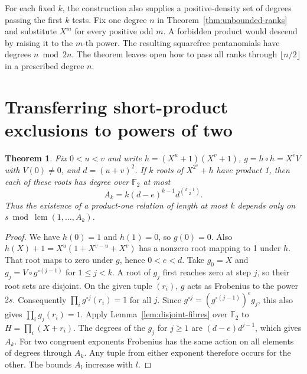\documentclass[11pt]{article}
\newtheorem{theorem}{Theorem}
\newcommand{\F}{\mathbb F_2}
\begin{document}
For each fixed \(k\), the construction also supplies a positive-density
set of degrees passing the first \(k\) tests. Fix one degree \(n\) in
Theorem~\ref{thm:unbounded-ranks} and substitute \(X^m\) for every
positive odd \(m\). A forbidden product would descend by raising it to
the \(m\)-th power. The resulting squarefree pentanomials have degrees
\(n\bmod 2n\). The theorem leaves open how to pass all ranks through
\(\lfloor n/2\rfloor\) in a prescribed degree \(n\).

\section{Transferring short-product exclusions to powers of two}

\begin{theorem}\label{thm:all-rank-period}
Fix \(0<u<v\) and write \(h=(X^u+1)(X^v+1)\),
\(g=h\circ h=X^e V\) with \(V(0)\ne0\), and \(d=(u+v)^2\).
If \(k\) roots of \(X^{2^s}+h\) have product 1, then each of these
roots has degree over \(\F\) at most
\[
                A_k=k(d-e)^{k-1}d^{\binom{k-1}{2}}.
\]
Thus the existence of a product-one relation of length at most \(k\)
depends only on \(s\bmod\operatorname{lcm}(1,\ldots,A_k)\).
\end{theorem}
\begin{proof}
We have \(h(0)=1\) and \(h(1)=0\), so \(g(0)=0\). Also
\(h(X)+1=X^u(1+X^{v-u}+X^v)\) has a nonzero root mapping to 1
under \(h\). That root maps to zero under \(g\), hence \(0<e<d\).
Take \(g_0=X\) and \(g_j=V\circ g^{\circ(j-1)}\) for \(1\le j<k\).
A root of \(g_j\) first reaches zero at step \(j\), so their root
sets are disjoint. On the given tuple \((r_i)\), \(g\) acts as
Frobenius to the power \(2s\). Consequently
\(\prod_i g^{\circ j}(r_i)=1\) for all \(j\). Since
\(g^{\circ j}=(g^{\circ(j-1)})^e g_j\), this also gives
\(\prod_i g_j(r_i)=1\). Apply Lemma~\ref{lem:disjoint-fibres} over
\(\F\) to \(H=\prod_i(X+r_i)\). The degrees of the \(g_j\) for
\(j\ge1\) are \((d-e)d^{j-1}\), which gives \(A_k\).
For two congruent exponents Frobenius has the same action on all
elements of degrees through \(A_k\). Any tuple from either exponent
therefore occurs for the other. The bounds \(A_l\) increase with \(l\).
\end{proof}
\end{document}
